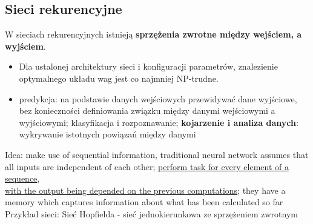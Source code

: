 \documentclass[10pt,a4paper]{article}
\begin{document}
\subsection{Sieci rekurencyjne}
W sieciach rekurencyjnych istnieją \textbf{sprzężenia zwrotne między wejściem, a wyjściem}.
  \begin{itemize}
    \item Dla ustalonej architektury sieci i konfiguracji parametrów, znalezienie optymalnego układu wag jest co najmniej NP-trudne.
    \item predykcja: na podstawie danych wejściowych przewidywać dane wyjściowe, bez konieczności definiowania związku między danymi wejściowymi a wyjściowymi; klasyfikacja i rozpoznawanie; \textbf{kojarzenie i analiza danych}: wykrywanie istotnych powiązań między danymi
  \end{itemize}
Idea: make use of sequential information, traditional neural network assumes that all inputs are independent of each other; \underline{perform task for every element of a sequence},\\ \underline{ with the output being depended on the previous computations}; they have a memory which captures information about what has been calculated so far
Przykład sieci: Sieć Hopfielda - sieć jednokierunkowa ze sprzężeniem zwrotnym
\end{document}
